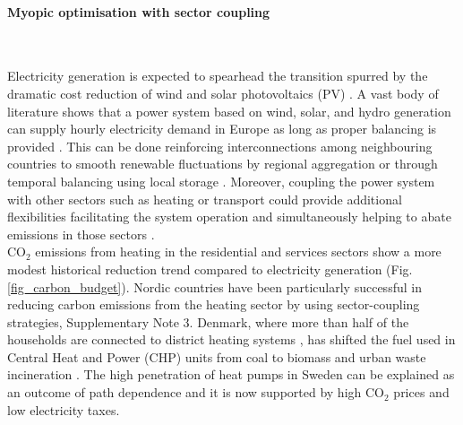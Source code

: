 \documentclass[5p]{elsarticle} %
\begin{document}
\FloatBarrier

\paragraph{\textbf{Myopic optimisation with sector coupling}} \

Electricity generation is expected to spearhead the transition spurred by the dramatic cost reduction of wind \cite{Lantz_2012} and solar photovoltaics (PV) \cite{Creutzig_2017, Haegel_2019}. A vast body of literature shows that a power system based on wind, solar, and hydro generation can supply hourly electricity demand in Europe as long as proper balancing is provided \cite{Eriksen_2017, Schlachtberger_2017, Gils_2017a, Brown_response}. This can be done reinforcing interconnections among neighbouring countries \cite{Rodriguez_2014} to smooth renewable fluctuations by regional aggregation or through temporal balancing using local storage \cite{Rasmussen_2012, Cebulla_2017, Victoria_2019_storage}. Moreover, coupling the power system with other sectors such as heating or transport could provide additional flexibilities facilitating the system operation and simultaneously helping to abate emissions in those sectors \cite{Connolly_2016, Brown_2018, Child_2019}. \\

CO$_2$ emissions from heating in the residential and services sectors show a more modest historical reduction trend compared to electricity generation (Fig. \ref{fig_carbon_budget}). Nordic countries have been particularly successful in reducing carbon emissions from the heating sector by using sector-coupling strategies, Supplementary Note 3. Denmark, where more than half of the households are connected to district heating systems \cite{Gross_2019}, has shifted the fuel used in Central Heat and Power (CHP) units from coal to biomass and urban waste incineration \cite{DEA_2015}. The high penetration of heat pumps in Sweden can be explained as an outcome of path dependence \cite{Gross_2019} and it is now supported by high CO$_2$ prices \cite{Carbon_pricing_2019} and low electricity taxes.\\ 
\end{document}

